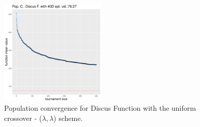 \begin{figure}[t]
	\includegraphics[width=0.45\textwidth]{img/uniform-40D/covergency_unimodal_uniform_11_dim_40.pdf}
	\caption{Population convergence for Discus Function with the uniform crossover - ($\lambda, \lambda$) scheme.}
	\label{convergence-uniform-11-a}
\end{figure}

%


